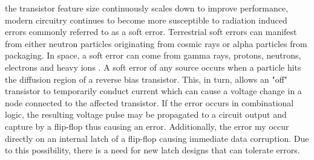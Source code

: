 
% 
 the transistor feature size continuously scales down to improve performance, modern circuitry continues to become more susceptible to radiation induced errors commonly referred to as a soft error. Terrestrial soft errors can manifest from either neutron particles originating from cosmic rays or alpha particles from packaging. In space, a soft error can come from gamma rays, protons, neutrons, electrons and heavy ions \cite{Zick2008, Schwank2013}. A soft error of any source occurs when a particle hits the diffusion region of a reverse bias transistor. This, in turn, allows an "off" transistor to temporarily conduct current which can cause a voltage change in a node connected to the affected transistor. If the error occurs in combinational logic, the resulting voltage pulse may be propagated to a circuit output and capture by a flip-flop thus causing an error. Additionally, the error my occur directly on an internal latch of a flip-flop causing immediate data corruption. Due to this possibility, there is a need for new latch designs that can tolerate errors.

